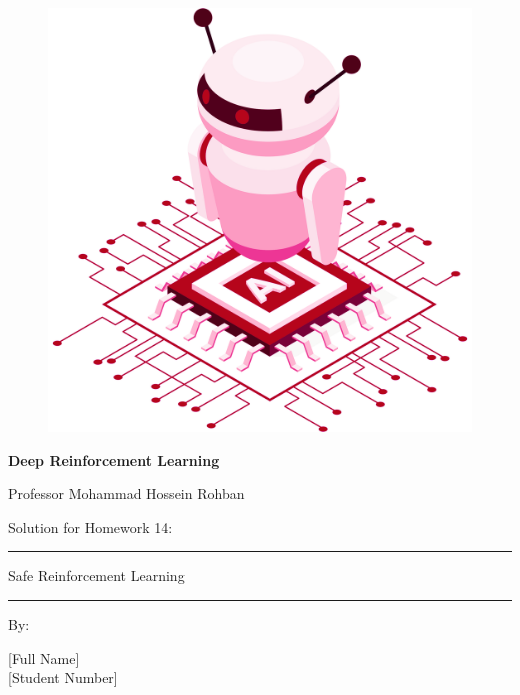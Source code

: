 \documentclass[12pt]{article}
\begin{document}
\thispagestyle{plain}

\begin{center}

\vspace*{-1.5cm}
\begin{figure}[!h]
    \centering
    \includegraphics[width=0.7\linewidth]{figs/cover-std.png}
\end{figure}

{

{\color{DarkBlue} {\fontsize{30}{50} \textbf{
Deep Reinforcement Learning
}}}

{\color{DarkBlue} {\Large
Professor Mohammad Hossein Rohban
}}
}


\vspace{20pt}

{


{\color{RedOrange}
{\Large
Solution for Homework 14:
}\\
}
{\color{BrickRed}
\rule{12cm}{0.5pt}

{\Huge
Safe Reinforcement Learning
}
\rule{12cm}{0.5pt}
}

\vspace{10pt}

{\color{RoyalPurple} { \small By:} } \\
\vspace{10pt}

{\color{Blue} { \LARGE [Full Name] } } \\
\vspace{5pt}
{\color{RoyalBlue} { \Large [Student Number] } }


}
\end{center}
\end{document}
